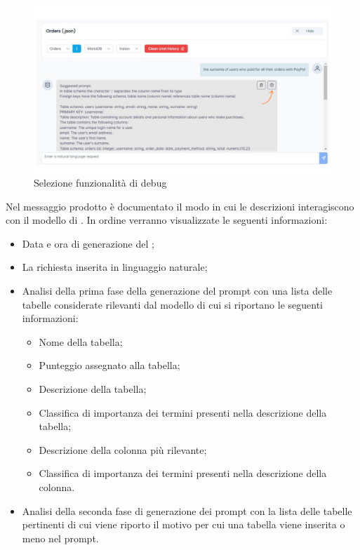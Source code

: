 \begin{figure}[H]
  \centering
  \includegraphics[width=1\textwidth]{assets/tasto_info_debug.png}
  \caption{Selezione funzionalità di debug}
\end{figure}

Nel messaggio prodotto è documentato il modo in cui le descrizioni interagiscono con il modello di . In ordine verranno visualizzate le seguenti informazioni: 
\begin{itemize}
  \item Data e ora di generazione del ; 
  \item La richiesta inserita in linguaggio naturale;
  \item Analisi della prima fase della generazione del prompt con una lista delle tabelle considerate rilevanti dal modello di cui si riportano le seguenti informazioni:
  \begin{itemize}
    \item Nome della tabella;
    \item Punteggio assegnato alla tabella;
    \item Descrizione della tabella;
    \item Classifica di importanza dei termini presenti nella descrizione della tabella;
    \item Descrizione della colonna più rilevante;
    \item Classifica di importanza dei termini presenti nella descrizione della colonna.
  \end{itemize}
  \item Analisi della seconda fase di generazione dei prompt con la lista delle tabelle pertinenti di cui viene riporto il motivo per cui una tabella viene inserita o meno nel prompt.
\end{itemize}


